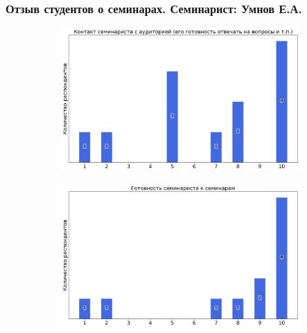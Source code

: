     \subsubsection{Отзыв студентов о семинарах. Семинарист: Умнов Е.А.}
        \begin{figure}[H]
            \centering
            \begin{subfigure}[b]{0.45\textwidth}
                \centering
                \includegraphics[width=\textwidth]{images/1 course/Аналитическая геометрия/seminarists-marks-Умнов Е.А.-0.png}
            \end{subfigure}
            \begin{subfigure}[b]{0.45\textwidth}
                \centering
                \includegraphics[width=\textwidth]{images/1 course/Аналитическая геометрия/seminarists-marks-Умнов Е.А.-1.png}
            \end{subfigure}
            \begin{subfigure}[b]{0.45\textwidth}
                \centering

\end{subfigure}
\end{figure}
